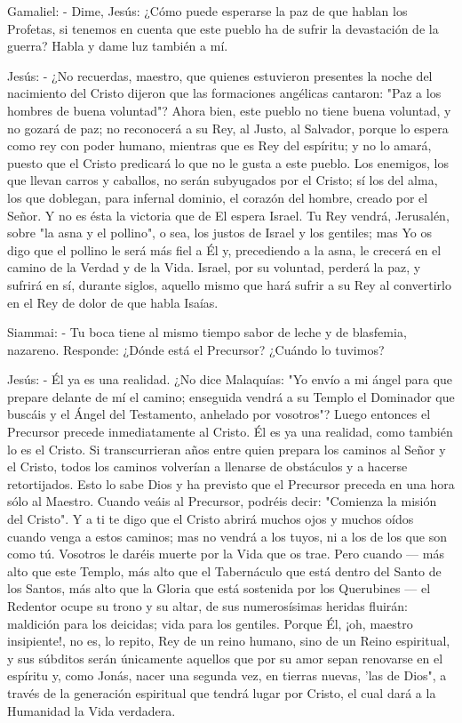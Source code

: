\documentclass[12pt, twoside, openright]{book} %
\begin{document}
Gamaliel: - Dime, Jesús: ¿Cómo puede esperarse la paz de que hablan los Profetas, si tenemos en cuenta que este pueblo ha de sufrir la devastación de la guerra? Habla y dame luz también a mí. 

Jesús: - ¿No recuerdas, maestro, que quienes estuvieron presentes la noche del nacimiento del Cristo dijeron que las formaciones angélicas cantaron: "Paz a los hombres de buena voluntad"? Ahora bien, este pueblo no tiene buena voluntad, y no gozará de paz; no reconocerá a su Rey, al Justo, al Salvador, porque lo espera como rey con poder humano, mientras que es Rey del espíritu; y no lo amará, puesto que el Cristo predicará lo que no le gusta a este pueblo. Los enemigos, los que llevan carros y caballos, no serán subyugados por el Cristo; sí los del alma, los que doblegan, para infernal dominio, el corazón del hombre, creado por el Señor. Y no es ésta la victoria que de El espera Israel. Tu Rey vendrá, Jerusalén, sobre "la asna y el pollino", o sea, los justos de Israel y los gentiles; mas Yo os digo que el pollino le será más fiel a Él y, precediendo a la asna, le crecerá en el camino de la Verdad y de la Vida. Israel, por su voluntad, perderá la paz, y sufrirá en sí, durante siglos, aquello mismo que hará sufrir a su Rey al convertirlo en el Rey de dolor de que habla Isaías. 

Siammai: - Tu boca tiene al mismo tiempo sabor de leche y de blasfemia, nazareno. Responde: ¿Dónde está el Precursor? ¿Cuándo lo tuvimos? 

Jesús: - Él ya es una realidad. ¿No dice Malaquías: "Yo envío a mi ángel para que prepare delante de mí el camino; enseguida vendrá a su Templo el Dominador que buscáis y el Ángel del Testamento, anhelado por vosotros"? Luego entonces el Precursor precede inmediatamente al Cristo. Él es ya una realidad, como también lo es el Cristo. Si transcurrieran años entre quien prepara los caminos al Señor y el Cristo, todos los caminos volverían a llenarse de obstáculos y a hacerse retortijados. Esto lo sabe Dios y ha previsto que el Precursor preceda en una hora sólo al Maestro. Cuando veáis al Precursor, podréis decir: "Comienza la misión del Cristo". Y a ti te digo que el Cristo abrirá muchos ojos y muchos oídos cuando venga a estos caminos; mas no vendrá a los tuyos, ni a los de los que son como tú. Vosotros le daréis muerte por la Vida que os trae. Pero cuando — más alto que este Templo, más alto que el Tabernáculo que está dentro del Santo de los Santos, más alto que la Gloria que está sostenida por los Querubines — el Redentor ocupe su trono y su altar, de sus numerosísimas heridas fluirán: maldición para los deicidas; vida para los gentiles. Porque Él, ¡oh, maestro insipiente!, no es, lo repito, Rey de un reino humano, sino de un Reino espiritual, y sus súbditos serán únicamente aquellos que por su amor sepan renovarse en el espíritu y, como Jonás, nacer una segunda vez, en tierras nuevas, 'las de Dios", a través de la generación espiritual que tendrá lugar por Cristo, el cual dará a la Humanidad la Vida verdadera. 
\end{document}
